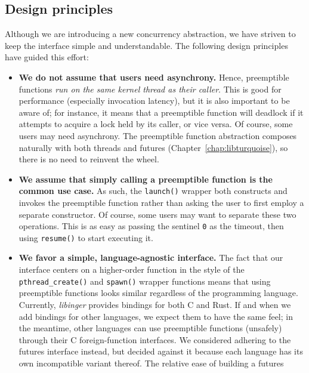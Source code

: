 \begin{swallowsections}

\end{swallowsections}


\subsection{Design principles}

Although we are introducing a new concurrency abstraction, we have striven to keep
the interface simple and understandable.  The following design principles have guided
this effort:
\begin{itemize}
\item \textbf{We do not assume that users need asynchrony.}  Hence, preemptible
	functions \textit{run on the same kernel thread as their caller}.  This is
	good for performance (especially invocation latency), but it is also
	important to be aware of; for instance, it means that a preemptible function
	will deadlock if it attempts to acquire a lock held by its caller, or vice
	versa.  Of course, some users may need asynchrony.  The preemptible function
	abstraction composes naturally with both threads and futures
	(Chapter~\ref{chap:libturquoise}), so there is no need to reinvent the wheel.
\item \textbf{We assume that simply calling a preemptible function is the common use
	case.}  As such, the \texttt{launch()} wrapper both constructs and invokes
	the preemptible function rather than asking the user to first employ a
	separate constructor.  Of course, some users may want to separate these two
	operations.  This is as easy as passing the sentinel \texttt{0} as the
	timeout, then using \texttt{resume()} to start executing it.
\item \textbf{We favor a simple, language-agnostic interface.}  The fact that our
	interface centers on a higher-order function in the style of the
	\texttt{pthread\_create()} and \texttt{spawn()} wrapper functions means that
	using preemptible functions looks similar regardless of the programming
	language.  Currently, \textit{libinger} provides bindings for both C and
	Rust.  If and when we add bindings for other languages, we expect them to
	have the same feel; in the meantime, other languages can use preemptible
	functions (unsafely) through their C
	foreign-function interfaces.  We considered adhering to the futures interface
	instead, but decided against it because each language has its own
	incompatible variant thereof.  The relative ease of building a futures

\end{itemize}
